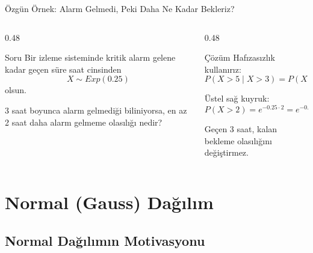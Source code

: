 \documentclass[light]{lutbeamer}
\begin{document}
\begin{frame}{Özgün Örnek: Alarm Gelmedi, Peki Daha Ne Kadar Bekleriz?}
\small
\begin{columns}[T,onlytextwidth]
    \begin{column}{0.48\textwidth}
        \begin{block}{Soru}
            Bir izleme sisteminde kritik alarm gelene kadar geçen süre saat cinsinden
            \[
            X \sim Exp(0.25)
            \]
            olsun.

            \vspace{0.15cm}
            3 saat boyunca alarm gelmediği biliniyorsa, en az 2 saat daha alarm gelmeme olasılığı nedir?
        \end{block}
    \end{column}
    \begin{column}{0.48\textwidth}
        \begin{exampleblock}{Çözüm}
            Hafızasızlık kullanırız:
            \[
            P(X>5 \mid X>3)=P(X>2)
            \]

            Üstel sağ kuyruk:
            \[
            P(X>2)=e^{-0.25 \cdot 2}=e^{-0.5}\approx 0.6065
            \]

            Geçen 3 saat, kalan bekleme olasılığını değiştirmez.
        \end{exampleblock}
    \end{column}
\end{columns}
\end{frame}

\section{Normal (Gauss) Dağılım}
\subsection{Normal Dağılımın Motivasyonu}
\end{document}
